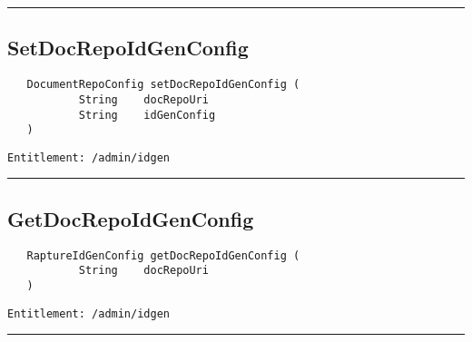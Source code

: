 \rule{12cm}{2pt}
\subsection{SetDocRepoIdGenConfig}
\label{Api:SetDocRepoIdGenConfig}
\begin{verbatim}
   DocumentRepoConfig setDocRepoIdGenConfig (
           String    docRepoUri
           String    idGenConfig
   )
\end{verbatim}
\begin{Verbatim}[fontsize=\small, formatcom=\color{Maroon}]
  Entitlement: /admin/idgen
\end{Verbatim}



\rule{12cm}{2pt}
\subsection{GetDocRepoIdGenConfig}
\label{Api:GetDocRepoIdGenConfig}
\begin{verbatim}
   RaptureIdGenConfig getDocRepoIdGenConfig (
           String    docRepoUri
   )
\end{verbatim}
\begin{Verbatim}[fontsize=\small, formatcom=\color{Maroon}]
  Entitlement: /admin/idgen
\end{Verbatim}



\rule{12cm}{2pt}
